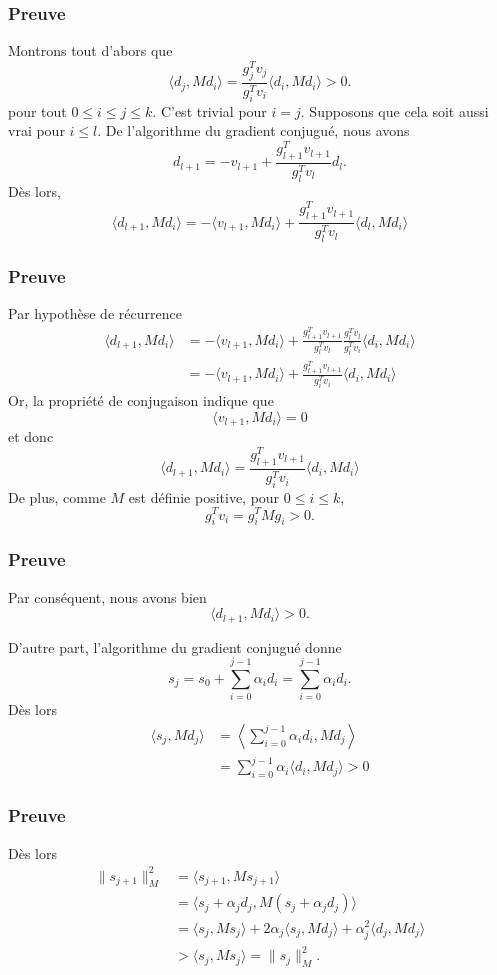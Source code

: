 \documentclass[usepdftitle=false]{beamer}
\begin{document}
\begin{frame}
\frametitle{Preuve}

Montrons tout d'abors que
$$
\langle d_j, Md_i \rangle
 = \frac{g_j^Tv_j}{g_i^Tv_i}\langle d_i, Md_i \rangle
> 0.
$$
pour tout $0 \leq i \leq j \leq k$.
C'est trivial pour $i = j$.
Supposons que cela soit aussi vrai pour $i \leq l$.
De l'algorithme du gradient conjugué, nous avons
$$
d_{l+1} = -v_{l+1} + \frac{g_{l+1}^Tv_{l+1}}{g_l^Tv_l}d_l.
$$
Dès lors,
$$
\langle d_{l+1}, Md_i \rangle
= -\langle v_{l+1}, Md_i \rangle + \frac{g_{l+1}^Tv_{l+1}}{g_l^Tv_l}\langle d_l, Md_i \rangle
$$

\end{frame}

\begin{frame}
\frametitle{Preuve}

Par hypothèse de récurrence
\begin{align*}
\langle d_{l+1}, Md_i \rangle
&= -\langle v_{l+1}, Md_i \rangle + \frac{g_{l+1}^Tv_{l+1}}{g_l^Tv_l}
\frac{g_l^Tv_l}{g_i^Tv_i}\langle d_i, Md_i \rangle \\
&= -\langle v_{l+1}, Md_i \rangle + \frac{g_{l+1}^Tv_{l+1}}{g_i^Tv_i}\langle d_i, Md_i \rangle
\end{align*}
Or, la propriété de conjugaison indique que
$$
\langle v_{l+1}, Md_i \rangle = 0
$$
et donc
$$
\langle d_{l+1}, Md_i \rangle
= \frac{g_{l+1}^Tv_{l+1}}{g_i^Tv_i}\langle d_i, Md_i \rangle
$$
De plus, comme $M$ est définie positive, pour $0 \leq i \leq k$,
$$
g_i^T v_i = g_i^T M g_i > 0.
$$

\end{frame}

\begin{frame}
\frametitle{Preuve}

Par conséquent, nous avons bien
$$
\langle d_{l+1}, Md_i \rangle > 0.
$$

\mbox{}

D'autre part, l'algorithme du gradient conjugué donne
$$
s_j = s_0 + \sum_{i = 0}^{j-1} \alpha_i d_i = \sum_{i = 0}^{j-1} \alpha_i d_i.
$$
Dès lors
\begin{align*}
\langle s_j, Md_j \rangle
&= \left\langle \sum_{i = 0}^{j-1} \alpha_i d_i, Md_j \right \rangle \\
&= \sum_{i = 0}^{j-1} \alpha_i \langle d_i, Md_j \rangle > 0
\end{align*}

\end{frame}

\begin{frame}
\frametitle{Preuve}

Dès lors
\begin{align*}
\| s_{j+1} \|_M^2
&= \langle s_{j+1}, Ms_{j+1} \rangle \\
&= \langle s_j + \alpha_j d_j, M (s_j + \alpha_j d_j) \rangle \\
&= \langle s_j, Ms_j \rangle + 2\alpha_j \langle s_j, Md_j\rangle
+ \alpha_j^2 \langle d_j, Md_j \rangle \\
&> \langle s_j, Ms_j \rangle = 
\| s_j \|_M^2.
\end{align*}

\end{frame}
\end{document}
